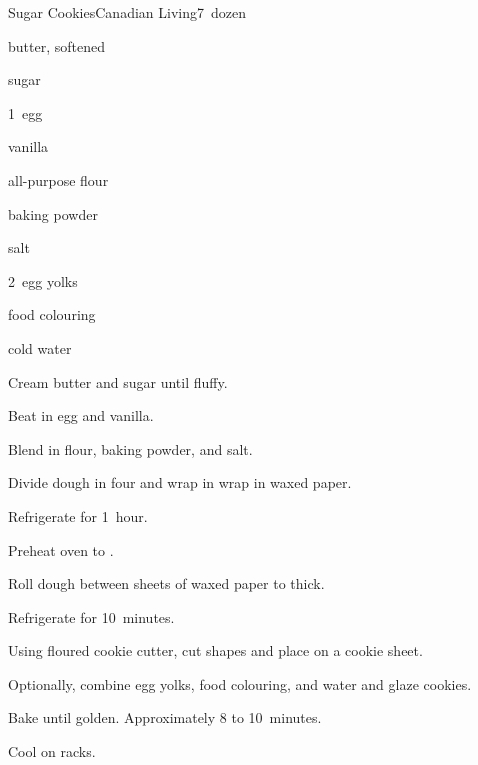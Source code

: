 \begin{recipe}{Sugar Cookies}{Canadian Living}{7~dozen}

\begin{ingredients}
\item {} butter, softened
\item {} sugar
\item 1~egg
\item \tp{\half} vanilla
\item {} all-purpose flour
\item \tp{1\half} baking powder
\item \tp{\quarter} salt
\item 2~egg yolks
\item food colouring
\item \tp{\half} cold water
\end{ingredients}

\begin{directions}
\item Cream butter and sugar until fluffy.
\item Beat in egg and vanilla.
\item Blend in flour, baking powder, and salt.
\item Divide dough in four and wrap in wrap in waxed paper.
\item Refrigerate for 1~hour.
\item Preheat oven to .
\item Roll dough between sheets of waxed paper to \inch{\eighth} thick.
\item Refrigerate for 10~minutes.
\item Using floured cookie cutter, cut shapes and place on a cookie sheet.
\item Optionally, combine egg yolks, food colouring, and water and glaze cookies.
\item Bake until golden. Approximately 8 to 10~minutes.
\item Cool on racks.
\end{directions}

\end{recipe}
